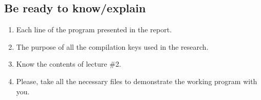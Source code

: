 { %
	\subsection{Be ready to know/explain}
	\begin{enumerate}
		\item Each line of the program presented in the report.
		\item The purpose of all the compilation keys used in the research.
		\item Know the contents of lecture \#2.
		\item Please, take all the necessary files to demonstrate the working program with you.
	\end{enumerate}
}